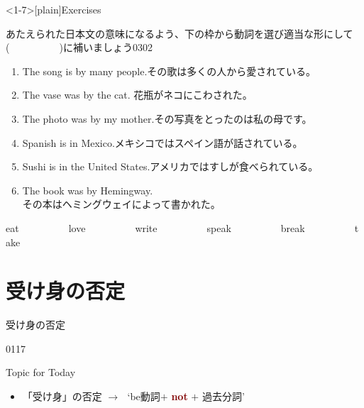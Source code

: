 \documentclass[aspectratio=169,xcolor={dvipsnames,table}]{beamer}
\newcommand{\myaudio}[1]{\href{#1}{\faVolumeUp}}
\begin{document}
\begin{frame}<1-7>[plain]{Exercises}

{\small あたえられた日本文の意味になるよう、下の枠から動詞を選び適当な形にして(~~~~~~~~~~)に補いましょう}\hfill{\tiny 0302}\,{\scriptsize \myaudio{./audio/051_passive_05.mp3}
}
\begin{enumerate}
 \item The song is  by many people.\hfill{\small その歌は多くの人から愛されている。}
 \item The vase was  by the cat. \hfill{\small 花瓶がネコにこわされた。}
 \item The photo was  by my mother.\hfill{\small その写真をとったのは私の母です。}
 \item Spanish is  in Mexico.\hfill{\small メキシコではスペイン語が話されている。}
 \item Sushi is  in the United States.\hfill{\small アメリカではすしが食べられている。}
 \item The book was  by Hemingway. \\
\hfill{\small その本はヘミングウェイによって書かれた。}
\end{enumerate}

\begin{tcolorbox}\centering
 eat~~~~~~~~~~love~~~~~~~~~~write~~~~~~~~~~speak~~~~~~~~~~break~~~~~~~~~~take
\end{tcolorbox}
\end{frame}
\section{受け身の否定}
\begin{frame}[plain]{受け身の否定}
\large

\hfill{}


\vfill

\hfill{\tiny 0117}\,{\scriptsize \myaudio{./audio/051_passive_06.mp3}}

\begin{exampleblock}{Topic for Today}
\begin{itemize}[square]\small
 \item 「受け身」の否定 $\longrightarrow$\,\,\,\,`be動詞$+$ \textcolor{Maroon}{{\bfseries not}} $+$ 過去分詞'
\end{itemize}
     \end{exampleblock}

\end{frame}
\end{document}
